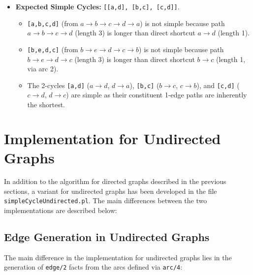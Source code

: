 \documentclass[12pt,a4paper]{article}
\begin{document}
\begin{itemize}
\begin{figure}[H]
\end{figure}
\item \textbf{Expected Simple Cycles:} \texttt{[[a,d], [b,c], [c,d]]}.
\begin{itemize}
\item \texttt{[a,b,c,d]} (from $a \rightarrow b \rightarrow c \rightarrow d \rightarrow a$) is not simple because path $a \rightarrow b \rightarrow c \rightarrow d$ (length 3) is longer than direct shortcut $a \rightarrow d$ (length 1). 
\item \texttt{[b,e,d,c]} (from $b \rightarrow e \rightarrow d \rightarrow c \rightarrow b$) is not simple because path $b \rightarrow e \rightarrow d \rightarrow c$ (length 3) is longer than direct shortcut $b \rightarrow c$ (length 1, via arc 2). 
\item The 2-cycles \texttt{[a,d]} ($a \rightarrow d$, $d \rightarrow a$), \texttt{[b,c]} ($b \rightarrow c$, $c \rightarrow b$), and \texttt{[c,d]} ($c \rightarrow d$, $d \rightarrow c$) are simple as their constituent 1-edge paths are inherently the shortest. 
\end{itemize}
\end{itemize}

\section{Implementation for Undirected Graphs}

In addition to the algorithm for directed graphs described in the previous sections, a variant for undirected graphs has been developed in the file \texttt{simpleCycleUndirected.pl}. The main differences between the two implementations are described below:

\subsection{Edge Generation in Undirected Graphs}
The main difference in the implementation for undirected graphs lies in the generation of \texttt{edge/2} facts from the arcs defined via \texttt{arc/4}:
\end{document}
